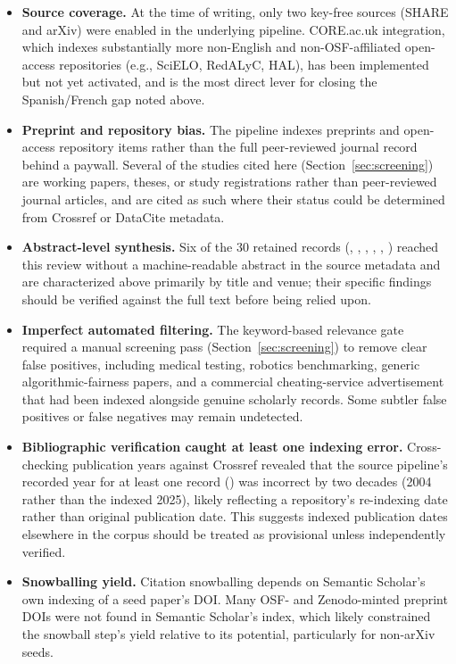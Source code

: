 \documentclass[11pt]{article}
\begin{document}
\begin{itemize}[leftmargin=*]
    \item \textbf{Source coverage.} At the time of writing, only two key-free sources (SHARE and arXiv) were enabled in the underlying pipeline. CORE.ac.uk integration, which indexes substantially more non-English and non-OSF-affiliated open-access repositories (e.g., SciELO, RedALyC, HAL), has been implemented but not yet activated, and is the most direct lever for closing the Spanish/French gap noted above.
    \item \textbf{Preprint and repository bias.} The pipeline indexes preprints and open-access repository items rather than the full peer-reviewed journal record behind a paywall. Several of the studies cited here (Section~\ref{sec:screening}) are working papers, theses, or study registrations rather than peer-reviewed journal articles, and are cited as such where their status could be determined from Crossref or DataCite metadata.
    \item \textbf{Abstract-level synthesis.} Six of the 30 retained records (\citet{stierwalt2000explanations}, \citet{zhou2024genderforced}, \citet{weick2024instruction}, \citet{reese2004teachersperceptions}, \citet{wallace2010motivation}, \citet{tseng2024taiwanese}) reached this review without a machine-readable abstract in the source metadata and are characterized above primarily by title and venue; their specific findings should be verified against the full text before being relied upon.
    \item \textbf{Imperfect automated filtering.} The keyword-based relevance gate required a manual screening pass (Section~\ref{sec:screening}) to remove clear false positives, including medical testing, robotics benchmarking, generic algorithmic-fairness papers, and a commercial cheating-service advertisement that had been indexed alongside genuine scholarly records. Some subtler false positives or false negatives may remain undetected.
    \item \textbf{Bibliographic verification caught at least one indexing error.} Cross-checking publication years against Crossref revealed that the source pipeline's recorded year for at least one record (\citet{reese2004teachersperceptions}) was incorrect by two decades (2004 rather than the indexed 2025), likely reflecting a repository's re-indexing date rather than original publication date. This suggests indexed publication dates elsewhere in the corpus should be treated as provisional unless independently verified.
    \item \textbf{Snowballing yield.} Citation snowballing depends on Semantic Scholar's own indexing of a seed paper's DOI. Many OSF- and Zenodo-minted preprint DOIs were not found in Semantic Scholar's index, which likely constrained the snowball step's yield relative to its potential, particularly for non-arXiv seeds.

\end{itemize}
\end{document}
